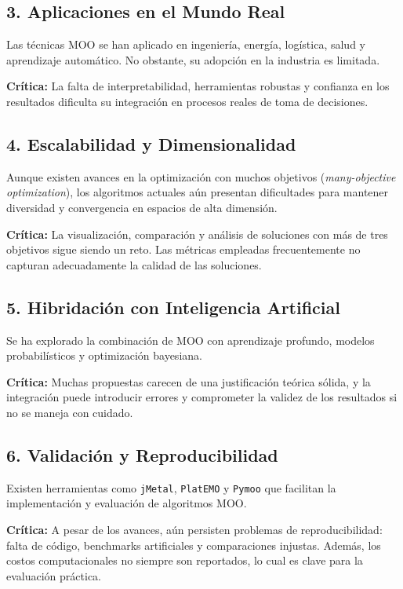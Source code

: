 \documentclass[12pt]{article}
\begin{document}
\subsection*{3. Aplicaciones en el Mundo Real}

Las técnicas MOO se han aplicado en ingeniería, energía, logística, salud y aprendizaje automático. No obstante, su adopción en la industria es limitada.

\textbf{Crítica:} La falta de interpretabilidad, herramientas robustas y confianza en los resultados dificulta su integración en procesos reales de toma de decisiones.

\subsection*{4. Escalabilidad y Dimensionalidad}

Aunque existen avances en la optimización con muchos objetivos (\textit{many-objective optimization}), los algoritmos actuales aún presentan dificultades para mantener diversidad y convergencia en espacios de alta dimensión.

\textbf{Crítica:} La visualización, comparación y análisis de soluciones con más de tres objetivos sigue siendo un reto. Las métricas empleadas frecuentemente no capturan adecuadamente la calidad de las soluciones.

\subsection*{5. Hibridación con Inteligencia Artificial}

Se ha explorado la combinación de MOO con aprendizaje profundo, modelos probabilísticos y optimización bayesiana.

\textbf{Crítica:} Muchas propuestas carecen de una justificación teórica sólida, y la integración puede introducir errores y comprometer la validez de los resultados si no se maneja con cuidado.

\subsection*{6. Validación y Reproducibilidad}

Existen herramientas como \texttt{jMetal}, \texttt{PlatEMO} y \texttt{Pymoo} que facilitan la implementación y evaluación de algoritmos MOO.

\textbf{Crítica:} A pesar de los avances, aún persisten problemas de reproducibilidad: falta de código, benchmarks artificiales y comparaciones injustas. Además, los costos computacionales no siempre son reportados, lo cual es clave para la evaluación práctica.
\end{document}
